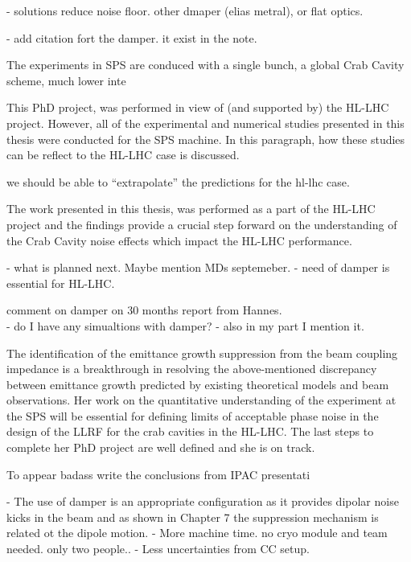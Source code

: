- solutions reduce noise floor. other dmaper (elias metral), or flat optics.


- add citation fort the damper. it exist in the note.


\newpage

The experiments in SPS are conduced with a single bunch, a global Crab Cavity scheme, much lower inte





This PhD project, was performed in view of (and supported by) the HL-LHC project. However, all of the experimental and numerical studies presented in this thesis were conducted for the SPS machine. In this paragraph, how these studies can be reflect to the HL-LHC case is discussed.



we should be able to “extrapolate” the predictions for  the hl-lhc case. 


The work presented in this thesis, was performed as a part of the HL-LHC project and the findings provide a crucial step forward on the understanding of the Crab Cavity noise effects which impact the HL-LHC performance. 


- what is planned next. Maybe mention MDs septemeber. 
- need of damper is essential for HL-LHC.

comment on damper on 30 months report from Hannes.\\
- do I have any simualtions with damper?
- also in my part I mention it.

The identification of the emittance growth suppression from the beam coupling impedance is a breakthrough in resolving the above-mentioned discrepancy between emittance growth predicted by existing theoretical models and beam observations. Her work on the quantitative understanding of the experiment at the SPS will be essential for defining limits of acceptable phase noise in the design of the LLRF for the crab cavities in the HL-LHC. The last steps to complete her PhD project are well defined and she is on track.








To appear badass write the conclusions from IPAC presentati


\newpage
- The use of damper is an appropriate configuration as it provides dipolar noise kicks in the beam and as shown in Chapter 7 the suppression mechanism is related ot the dipole motion. 
- More machine time. no cryo module and team needed. only two people..
- Less uncertainties from CC setup.




